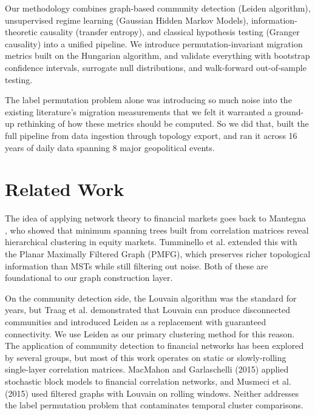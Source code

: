 \documentclass[12pt, letterpaper]{article}
\begin{document}
Our methodology combines graph-based community detection (Leiden algorithm), unsupervised regime learning (Gaussian Hidden Markov Models), information-theoretic causality (transfer entropy), and classical hypothesis testing (Granger causality) into a unified pipeline. We introduce permutation-invariant migration metrics built on the Hungarian algorithm, and validate everything with bootstrap confidence intervals, surrogate null distributions, and walk-forward out-of-sample testing.

The label permutation problem alone was introducing so much noise into the existing literature's migration measurements that we felt it warranted a ground-up rethinking of how these metrics should be computed. So we did that, built the full pipeline from data ingestion through topology export, and ran it across 16 years of daily data spanning 8 major geopolitical events.

\section{Related Work}

The idea of applying network theory to financial markets goes back to Mantegna \cite{mantegna1999}, who showed that minimum spanning trees built from correlation matrices reveal hierarchical clustering in equity markets. Tumminello et al. \cite{tumminello2005} extended this with the Planar Maximally Filtered Graph (PMFG), which preserves richer topological information than MSTs while still filtering out noise. Both of these are foundational to our graph construction layer.

On the community detection side, the Louvain algorithm was the standard for years, but Traag et al. \cite{traag2019} demonstrated that Louvain can produce disconnected communities and introduced Leiden as a replacement with guaranteed connectivity. We use Leiden as our primary clustering method for this reason. The application of community detection to financial networks has been explored by several groups, but most of this work operates on static or slowly-rolling single-layer correlation matrices. MacMahon and Garlaschelli (2015) applied stochastic block models to financial correlation networks, and Musmeci et al. (2015) used filtered graphs with Louvain on rolling windows. Neither addresses the label permutation problem that contaminates temporal cluster comparisons.
\end{document}
